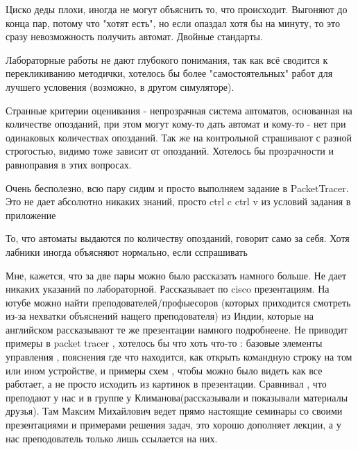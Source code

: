             \begin{commentbox} 
                Циско деды плохи, иногда не могут объяснить то, что происходит. Выгоняют до конца пар, потому что "хотят есть", но если опаздал хотя бы на минуту, то это сразу невозможность получить автомат. Двойные стандарты. 
            \end{commentbox} 
        
            \begin{commentbox} 
                Лабораторные работы не дают глубокого понимания, так как всё сводится к перекликиванию методички, хотелось бы более "самостоятельных" работ для лучшего условения (возможно, в другом симуляторе). 
        
                Странные критерии оценивания - непрозрачная система автоматов, основанная на количестве опозданий, при этом могут кому-то дать автомат и кому-то - нет при одинаковых количествах опозданий.  Так же на контрольной страшивают с разной строгостью, видимо тоже зависит от опозданий. Хотелось бы прозрачности и равноправия в этих вопросах. 
            \end{commentbox} 
        
            \begin{commentbox} 
                Очень бесполезно, всю пару сидим и просто выполняем задание в PacketTracer. Это не дает абсолютно никаких знаний, просто ctrl c ctrl v из условий задания в приложение 
            \end{commentbox} 
        
            \begin{commentbox} 
                То, что автоматы выдаются по количеству опозданий, говорит само за себя. Хотя лабники иногда объясняют нормально, если сспрашивать 
            \end{commentbox} 
        
            \begin{commentbox} 
                Мне,  кажется, что за две пары можно было рассказать намного больше. Не дает никаких указаний по лабораторной. Рассказывает по cisco презентациям. На ютубе можно найти преподователей/профыесоров (которых приходится смотреть из-за нехватки объяснений нащего преподователя) из Индии, которые на английском рассказывают те же презентации намного подробнеене.  Не приводит примеры в packet tracer , хотелось бы что хоть что-то : базовые элементы управления , пояснения где что находится, как открыть командную строку на том или ином устройстве, и примеры схем , чтобы можно было видеть как все работает, а не просто исходить из картинок в презентации. Сравнивал , что преподают у нас и в группе у Климанова(рассказывали и показывали материалы друзья). Там Максим  Михайлович ведет прямо настоящие семинары со своими презентациями и примерами решения задач, это хорошо дополняет лекции, а у нас преподователь только лишь ссылается на них. 
            \end{commentbox} 

